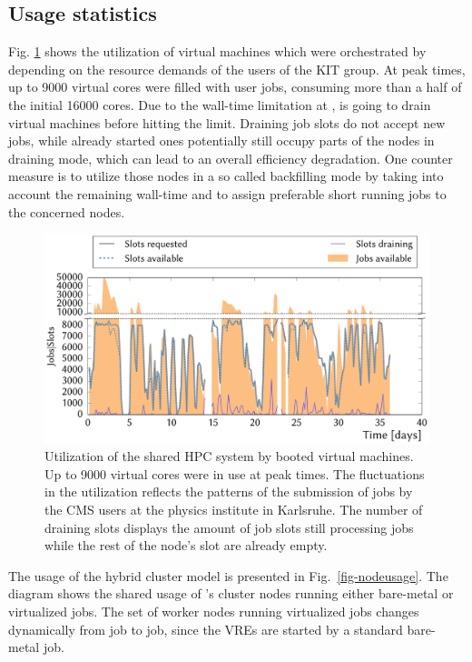 \subsection{Usage statistics}
Fig. \ref{fig-frplots} shows the utilization of virtual machines which were orchestrated by \Roced depending on the resource demands of the users of the KIT group.
At peak times, up to 9000 virtual cores were filled with user jobs, consuming more than a half of the initial 16000 \NEMO cores. 
Due to the wall-time limitation at \NEMO, \Roced is going to drain virtual machines before hitting the limit. Draining job slots do not accept new jobs, while already started ones potentially still occupy parts of the nodes in draining mode, which can lead to an overall efficiency degradation.  One counter measure is to utilize those nodes in a so called backfilling mode by taking into account the remaining wall-time and to assign preferable short running jobs to the concerned nodes.

\begin{figure}
\begin{center}
  \includegraphics[width=1.0\linewidth]{NEMO_KIT_utiliztion.pdf}
  \caption{Utilization of the shared HPC system by booted virtual machines. Up to 9000 virtual cores were in use at peak times. The fluctuations in the utilization reflects the patterns of the submission of jobs by the CMS users at the physics institute in Karlsruhe. The number of draining slots displays the amount of job slots still processing jobs while the rest of the node's slot are already empty.}
  \label{fig-frplots}
\end{center}
\end{figure}

The usage of the hybrid cluster model is presented in Fig.~\ref{fig-nodeusage}.
The diagram shows the shared usage of \NEMO's cluster nodes running either
bare-metal or virtualized jobs. The set of worker nodes running
virtualized jobs changes  dynamically from job to job, since the VREs
are started by a standard bare-metal job.


